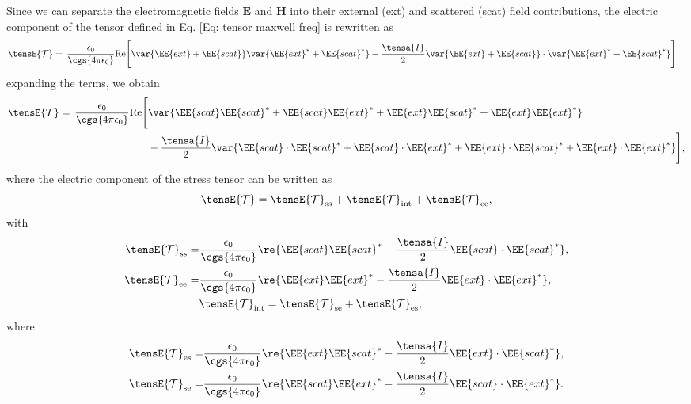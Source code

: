 Since we can separate the electromagnetic fields $\mathbf{E}$ and $\mathbf{H}$ into their external (ext) and scattered (scat) field contributions, the electric component of the tensor defined in Eq. \eqref{Eq: tensor maxwell freq} is rewritten as
\begin{align}
\tensE{\mathcal{T}}=\,\frac{\epsilon_0}{\cgs{4\pi\epsilon_0}} {\rm Re} \Bigg[& \var{\EE{ext}+\EE{scat}}\var{\EE{ext}^{*}+\EE{scat}^{*}}-\frac{\tensa{I}}{2}\var{\EE{ext}+\EE{scat}}\cdot\var{\EE{ext}^{*}+\EE{scat}^{*}} \Bigg] \nonumber 
\end{align}
expanding the terms, we obtain
\begin{align}
\tensE{\mathcal{T}}= \, \frac{\epsilon_0}{\cgs{4\pi\epsilon_0}} {\rm Re} \Bigg[& \var{\EE{scat}\EE{scat}^{*}+\EE{scat}\EE{ext}^{*}+\EE{ext}\EE{scat}^{*}+\EE{ext}\EE{ext}^{*}}\nonumber \\
&-\frac{\tensa{I}}{2}\var{\EE{scat}\cdot\EE{scat}^{*}+\EE{scat}\cdot\EE{ext}^{*}+\EE{ext}\cdot\EE{scat}^{*}+\EE{ext}\cdot\EE{ext}^{*}} \Bigg],
\label{eq: tensor de esfuerzos inicio}
\end{align}
where the electric component of the stress tensor can be written as
\begin{equation}
\tensE{\mathcal{T}}=\tensE{\mathcal{T}}_{\rm ss}+\tensE{\mathcal{T}}_{\rm int}+\tensE{\mathcal{T}}_{\rm ee},
\end{equation}
with
\begin{align}
\tensE{\mathcal{T}}_{\rm ss} =& \frac{\epsilon_0}{\cgs{4\pi\epsilon_0}} \re{\EE{scat}\EE{scat}^{*}-\frac{\tensa{I}}{2}\EE{scat}\cdot\EE{scat}^{*}},\label{Eq: tensor de esfuerzos inicio 2}\\
\tensE{\mathcal{T}}_{\rm ee} =& \frac{\epsilon_0}{\cgs{4\pi\epsilon_0}} \re{\EE{ext}\EE{ext}^{*}-\frac{\tensa{I}}{2}\EE{ext}\cdot\EE{ext}^{*}}, \label{Eq: Tee}\\
&\tensE{\mathcal{T}}_{\rm int} = \tensE{\mathcal{T}}_{\rm se} + \tensE{\mathcal{T}}_{\rm es},
\end{align}
where
\begin{align}
\tensE{\mathcal{T}}_{\rm es} =& \frac{\epsilon_0}{\cgs{4\pi\epsilon_0}} \re{\EE{ext}\EE{scat}^{*}-\frac{\tensa{I}}{2}\EE{ext}\cdot\EE{scat}^{*}},\label{Eq: Tes}\\
\tensE{\mathcal{T}}_{\rm se} =& \frac{\epsilon_0}{\cgs{4\pi\epsilon_0}} \re{\EE{scat}\EE{ext}^{*}-\frac{\tensa{I}}{2}\EE{scat}\cdot\EE{ext}^{*}}.
\label{eq: tensor de esfuerzos final}
\end{align}
